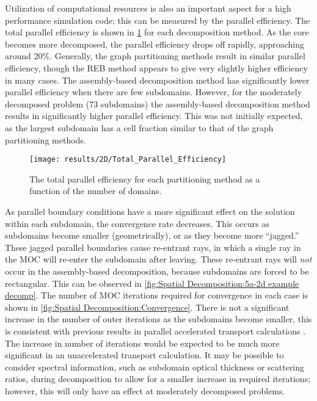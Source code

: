 {{{{        Utilization of computational resources is also an important aspect for a high performance simulation code; this can be measured by the parallel efficiency.
        The total parallel efficiency is shown in \cref{fig:Spatial Decomposition:Parallel Efficiency} for each decomposition method.
        As the core becomes more decomposed, the parallel efficiency drops off rapidly, approaching around 20\%.
        Generally, the graph partitioning methods result in similar parallel efficiency, though the \ac{REB} method appears to give very slightly higher efficiency in many cases.
        The assembly-based decomposition method has significantly lower parallel efficiency when there are few subdomains.
        However, for the moderately decomposed problem (73 subdomains) the assembly-based decomposition method results in significantly higher parallel efficiency.
        This was not initially expected, as the largest subdomain has a cell fraction similar to that of the graph partitioning methods.

        \begin{figure}
          \centering
          \texttt{[image: results/2D/Total\_Parallel\_Efficiency]}
          \caption{The total parallel efficiency for each partitioning method as a function of the number of domains. \label{fig:Spatial Decomposition:Parallel Efficiency}}
        \end{figure}

        As parallel boundary conditions have a more significant effect on the solution within each subdomain, the convergence rate decreases.
        This occurs as subdomains become smaller (geometrically), or as they become more ``jagged.''
        These jagged parallel boundaries cause re-entrant rays, in which a single ray in the \ac{MOC} will re-enter the subdomain after leaving.
        These re-entrant rays will \emph{not} occur in the assembly-based decomposition, because subdomains are forced to be rectangular.
        This can be observed in \cref{fig:Spatial Decomposition:5a-2d example decomp}.
        The number of \ac{MOC} iterations required for convergence in each case is shown in \cref{fig:Spatial Decomposition:Convergence}.
        There is not a significant increase in the number of outer iterations as the subdomains become smaller, this is consistent with previous results in parallel accelerated transport calculations \cite{Kelley2012,Stimpson2014,Kochunas2014}.
        The increase in number of iterations would be expected to be much more significant in an unaccelerated transport calculation.
        It may be possible to consider spectral information, such as subdomain optical thickness or scattering ratios, during decomposition to allow for a smaller increase in required iterations; however, this will only have an effect at moderately decomposed problems.

}}}}
